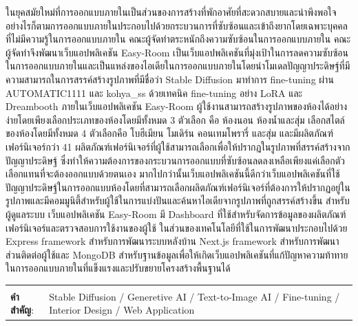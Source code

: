 \documentclass[12pt,oneside,openright,a4paper]{cpe-thai-project}
\begin{document}
\thaiabstract

\hspace{18pt}ในยุคสมัยใหม่ที่การออกแบบภายในเป็นส่วนของการสร้างที่พักอาศัยที่สะดวกสบายและน่าพึงพอใจ อย่างไรก็ตามการออกแบบภายในประกอบไปด้วยกระบวนการที่ซับซ้อนและเข้าถึงยากโดยเฉพาะบุคคลที่ไม่มีความรู้ในการออกแบบภายใน คณะผู้จัดทำตระหนักถึงความซับซ้อนในการออกแบบภายใน คณะผู้จัดทำจึงพัฒนาเว็บแอปพลิเคชัน Easy-Room เป็นเว็บแอปพลิเคชันที่มุ่งเป้าในการลดความซับซ้อนในการออกแบบภายในและเป็นแหล่งของไอเดียในการออกแบบภายในโดยนำโมเดลปัญญาประดิษฐ์ที่มีความสามารถในการสรรค์สร้างรูปภาพที่มีชื่อว่า Stable Diffusion มาทำการ fine-tuning ผ่าน AUTOMATIC1111 และ kohya\_ss ด้วยเทคนิค fine-tuning อย่าง LoRA และ Dreambooth ภายในเว็บแอปพลิเคชัน Easy-Room ผู้ใช้งานสามารถสร้างรูปภาพของห้องได้อย่างง่ายโดยเพียงเลือกประเภทของห้องโดยมีทั้งหมด 3 ตัวเลือก คือ ห้องนอน ห้องน้ำและสุ่ม เลือกสไตล์ของห้องโดยมีทั้งหมด 4 ตัวเลือกคือ โบฮีเมียน โมเดิร์น คอนเทมโพรารี่ และสุ่ม และมีผลิตภัณฑ์เฟอร์นิเจอร์กว่า 41 ผลิตภัณฑ์เฟอร์นิเจอร์ที่ผู้ใช้สามารถเลือกเพื่อให้ปรากฏในรูปภาพที่สรรค์สร้างจากปัญญาประดิษฐ์ ซึ่งทำให้ความต้องการของกระบวนการออกแบบที่ซับซ้อนลดลงเหลือเพียงแค่เลือกตัวเลือกแทนที่จะต้องออกแบบด้วยตนเอง มากไปกว่านั้นเว็บแอปพลิเคชันนี้ดีกว่าเว็บแอปพลิเคชันที่ใช้ปัญญาประดิษฐ์ในการออกแบบห้องโดยที่สามารถเลือกผลิตภัณฑ์เฟอร์นิเจอร์ที่ต้องการให้ปรากฏอยู่ในรูปภาพและมีคอมมูนิตี้สำหรับผู้ใช้ในการแบ่งปันและค้นหาไอเดียจากรูปภาพที่ถูกสรรค์สร้างขึ้น สำหรับผู้ดูแลระบบ เว็บแอปพลิเคชัน Easy-Room มี Dashboard ที่ใช้สำหรับจัดการข้อมูลของผลิตภัณฑ์เฟอร์นิเจอร์และตรวจสอบการใช้งานของผู้ใช้ ในส่วนของเทคโนโลยีที่ใช้ในการพัฒนาประกอบไปด้วย Express framework สำหรับการพัฒนาระบบหลังบ้าน Next.js framework สำหรับการพัฒนาส่วนติดต่อผู้ใช้และ MongoDB สำหรับฐานข้อมูลเพื่อให้เกิดเว็บแอปพลิเคชันที่แก้ปัญหาความท้าทายในการออกแบบภายในที่แข็งแรงและปรับขยายโครงสร้างพื้นฐานได้

\begin{flushleft}
  \begin{tabular*}{\textwidth}{@{}lp{}}
    & \\

    \textbf{คำสำคัญ}: & Stable Diffusion / Generetive AI / Text-to-Image AI / Fine-tuning / Interior Design / Web Application
  \end{tabular*}
\end{flushleft}
\endabstract
\end{document}
